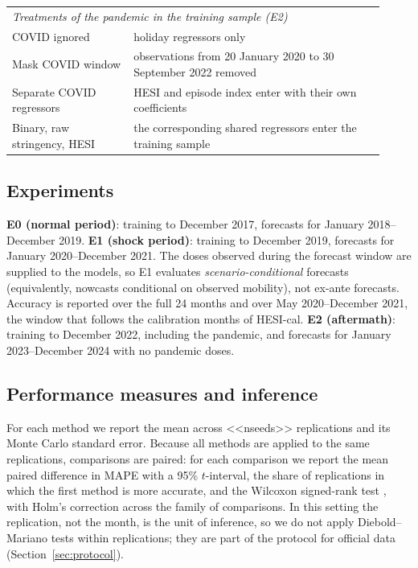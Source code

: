 \documentclass{article}
\theoremstyle{plain}
\theoremstyle{definition}
\theoremstyle{remark}
\begin{document}
\begin{table}[t]
\begin{tabular}{p{0.30\linewidth}p{0.62\linewidth}}
\midrule
\multicolumn{2}{l}{\textit{Treatments of the pandemic in the training sample (E2)}} \\
COVID ignored & holiday regressors only \\
Mask COVID window & observations from 20 January 2020 to 30 September 2022 removed \\
Separate COVID regressors & HESI and episode index enter with their own coefficients \\
Binary, raw stringency, HESI & the corresponding shared regressors enter the training sample \\
\bottomrule
\end{tabular}
\end{table}

\subsection{Experiments}
\textbf{E0 (normal period)}: training to December 2017, forecasts for January 2018--December 2019. \textbf{E1 (shock period)}: training to December 2019, forecasts for January 2020--December 2021. The doses observed during the forecast window are supplied to the models, so E1 evaluates \emph{scenario-conditional} forecasts (equivalently, nowcasts conditional on observed mobility), not ex-ante forecasts. Accuracy is reported over the full 24 months and over May 2020--December 2021, the window that follows the calibration months of HESI-cal. \textbf{E2 (aftermath)}: training to December 2022, including the pandemic, and forecasts for January 2023--December 2024 with no pandemic doses.

\subsection{Performance measures and inference}
For each method we report the mean across <<nseeds>> replications and its Monte Carlo standard error. Because all methods are applied to the same replications, comparisons are paired: for each comparison we report the mean paired difference in MAPE with a 95\% $t$-interval, the share of replications in which the first method is more accurate, and the Wilcoxon signed-rank test \citep{wilcoxon1945individual}, with Holm's correction across the family of comparisons. In this setting the replication, not the month, is the unit of inference, so we do not apply Diebold--Mariano tests \citep{diebold1995comparing, harvey1997testing} within replications; they are part of the protocol for official data (Section~\ref{sec:protocol}).
\end{document}
